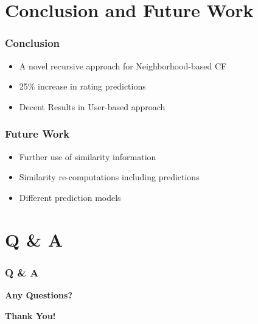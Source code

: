 \documentclass[11pt,aspectratio=169]{beamer}
\begin{document}
\section{Conclusion and Future Work}
\begin{frame}
    \frametitle{Conclusion}
    \begin{itemize}
        \item A novel recursive approach for Neighborhood-based CF
        \item 25\% increase in rating predictions
        \item Decent Results in User-based approach
    \end{itemize}
\end{frame}
\begin{frame}
    \frametitle{Future Work}
    \begin{itemize}
        \item Further use of similarity information
        \item Similarity re-computations including predictions
        \item Different prediction models
    \end{itemize}
\end{frame}
\section{Q \& A}
\begin{frame}
    \frametitle{Q \& A}
    \centering
    \textbf{Any Questions?}
\end{frame}
\begin{frame}
    \centering
    \textbf{Thank You!}
\end{frame}
\end{document}
